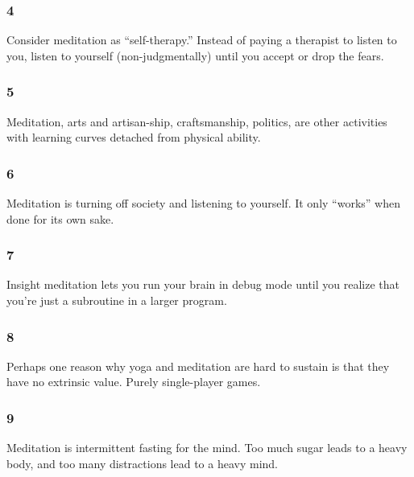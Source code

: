 \begin{frame}[fragile]\frametitle{4}
\begin{center}
Consider meditation as “self-therapy.” Instead of paying a therapist to listen to you, listen to yourself (non-judgmentally) until you accept or drop the fears.
\end{center}
\end{frame}

\begin{frame}[fragile]\frametitle{5}
\begin{center}
Meditation, arts and artisan-ship, craftsmanship, politics, are other activities with learning curves detached from physical ability.
\end{center}
\end{frame}

\begin{frame}[fragile]\frametitle{6}
\begin{center}
Meditation is turning off society and listening to yourself. It only “works” when done for its own sake.\end{center}
\end{frame}

\begin{frame}[fragile]\frametitle{7}
\begin{center}
Insight meditation lets you run your brain in debug mode until you realize that you're just a subroutine in a larger program.
\end{center}
\end{frame}

\begin{frame}[fragile]\frametitle{8}
\begin{center}
Perhaps one reason why yoga and meditation are hard to sustain is that they have no extrinsic value. Purely single-player games.
\end{center}
\end{frame}

\begin{frame}[fragile]\frametitle{9}
\begin{center}
Meditation is intermittent fasting for the mind. Too much sugar leads to a heavy body, and too many distractions lead to a heavy mind.
\end{center}
\end{frame}


